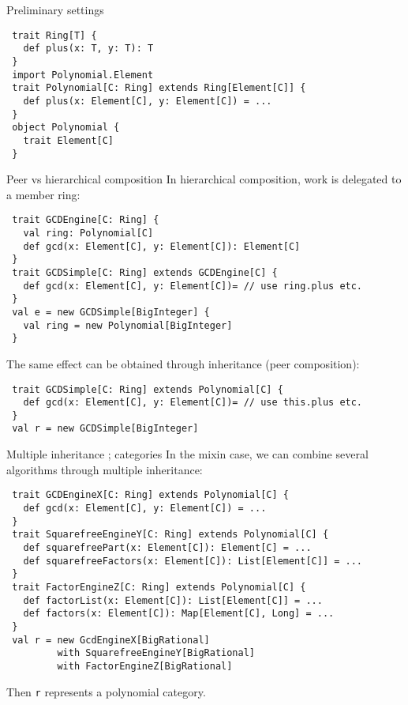 \documentclass[final]{beamer}
\newcommand{\code}[1]{\texttt{#1}}
\begin{document}
\begin{frame}[fragile]
\begin{columns}[t]
\begin{column}{.3\linewidth}
  \begin{block}{\large Preliminary settings}
\tiny
\begin{lstlisting}
 trait Ring[T] {
   def plus(x: T, y: T): T
 }
 import Polynomial.Element
 trait Polynomial[C: Ring] extends Ring[Element[C]] {
   def plus(x: Element[C], y: Element[C]) = ...
 }
 object Polynomial {
   trait Element[C]
 }
\end{lstlisting}
  \end{block}
  \hfill
  \begin{block}{\large Peer vs hierarchical composition}
\tiny
{\footnotesize In hierarchical composition, work is delegated to
a member ring:}\par
\begin{lstlisting}
 trait GCDEngine[C: Ring] {
   val ring: Polynomial[C]
   def gcd(x: Element[C], y: Element[C]): Element[C]
 }
 trait GCDSimple[C: Ring] extends GCDEngine[C] {
   def gcd(x: Element[C], y: Element[C])= // use ring.plus etc.
 }
 val e = new GCDSimple[BigInteger] {
   val ring = new Polynomial[BigInteger]
 }
\end{lstlisting}
{\footnotesize The same effect can be obtained through inheritance
(peer composition):}\par
\begin{lstlisting}
 trait GCDSimple[C: Ring] extends Polynomial[C] {
   def gcd(x: Element[C], y: Element[C])= // use this.plus etc.
 }
 val r = new GCDSimple[BigInteger]
\end{lstlisting}
  \end{block}
  \hfill
  \begin{block}{\large Multiple inheritance ; categories}
\tiny
{\footnotesize In the mixin case, we can combine several
algorithms through multiple inheritance:}\par
\begin{lstlisting}
 trait GCDEngineX[C: Ring] extends Polynomial[C] {
   def gcd(x: Element[C], y: Element[C]) = ...
 }
 trait SquarefreeEngineY[C: Ring] extends Polynomial[C] {
   def squarefreePart(x: Element[C]): Element[C] = ...
   def squarefreeFactors(x: Element[C]): List[Element[C]] = ...
 }
 trait FactorEngineZ[C: Ring] extends Polynomial[C] {
   def factorList(x: Element[C]): List[Element[C]] = ...
   def factors(x: Element[C]): Map[Element[C], Long] = ...
 }
 val r = new GcdEngineX[BigRational] 
         with SquarefreeEngineY[BigRational]
         with FactorEngineZ[BigRational]
\end{lstlisting}
{\footnotesize Then \code{r} represents a polynomial category.
}
\end{block}
\end{column}
\end{columns}
\end{frame}
\end{document}
